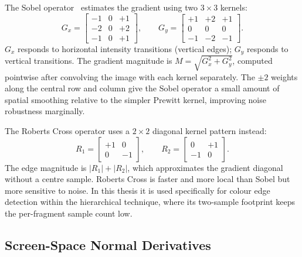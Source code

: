 The Sobel operator~\cite{gonzalez2018} estimates the gradient using two $3\times3$ kernels:
\begin{equation}
  G_x = \begin{bmatrix} -1 & 0 & +1 \\ -2 & 0 & +2 \\ -1 & 0 & +1 \end{bmatrix}, \qquad
  G_y = \begin{bmatrix} +1 & +2 & +1 \\ 0 & 0 & 0 \\ -1 & -2 & -1 \end{bmatrix}.
  \label{eq:sobel_kernels}
\end{equation}
$G_x$ responds to horizontal intensity transitions (vertical edges); $G_y$ responds to vertical transitions. The gradient magnitude is $M = \sqrt{G_x^2 + G_y^2}$, computed pointwise after convolving the image with each kernel separately. The $\pm2$ weights along the central row and column give the Sobel operator a small amount of spatial smoothing relative to the simpler Prewitt kernel, improving noise robustness marginally.

The Roberts Cross operator uses a $2\times2$ diagonal kernel pattern instead:
\begin{equation}
  R_1 = \begin{bmatrix} +1 & 0 \\ 0 & -1 \end{bmatrix}, \qquad
  R_2 = \begin{bmatrix} 0 & +1 \\ -1 & 0 \end{bmatrix}.
  \label{eq:roberts_kernels}
\end{equation}
The edge magnitude is $\lvert R_1 \rvert + \lvert R_2 \rvert$, which approximates the gradient diagonal without a centre sample. Roberts Cross is faster and more local than Sobel but more sensitive to noise. In this thesis it is used specifically for colour edge detection within the hierarchical technique, where its two-sample footprint keeps the per-fragment sample count low.

\subsection{Screen-Space Normal Derivatives}
\label{sec:background_normal_deriv}

